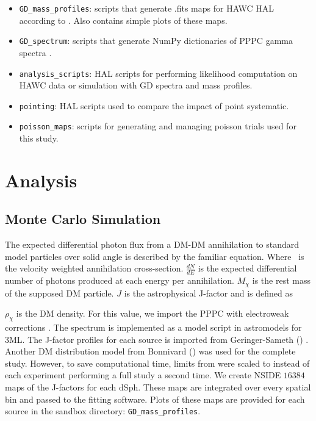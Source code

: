 \begin{itemize}
    \item \texttt{GD\_mass\_profiles}: scripts that generate .fits maps for HAWC HAL according to \cite{Geringer-Sameth:2014yza}. Also contains simple plots of these maps.
    \item \texttt{GD\_spectrum}: scripts that generate NumPy dictionaries of PPPC gamma spectra \cite{Cirelli_2011}.
    \item \texttt{analysis\_scripts}: HAL scripts for performing likelihood computation on HAWC data or simulation with GD spectra and mass profiles.
    \item \texttt{pointing}: HAL scripts used to compare the impact of point systematic.
    \item \texttt{poisson\_maps}: scripts for generating and managing poisson trials used for this study.
\end{itemize}

\section{Analysis}

\subsection{Monte Carlo Simulation}
The expected differential photon flux from a DM-DM annihilation to standard model
particles over solid angle is described by the familiar equation.
\iddmannilation[\gamma]
Where \sv~is the velocity weighted annihilation cross-section.
$\frac{dN}{dE}$ is the expected differential number of photons produced at each energy per annihilation.
$M_\chi$ is the rest mass of the supposed DM particle.
$J$ is the astrophysical J-factor and is defined as

$\rho_{\chi}$ is the DM density.
For this value, we import the PPPC with electroweak corrections \cite{Cirelli_2011}.
The spectrum is implemented as a model script in astromodels for 3ML.
The J-factor profiles for each source is imported from Geringer-Sameth (\GS) \cite{Geringer_Sameth_2015}.
Another DM distribution model from Bonnivard (\B) \cite{Bonnivard:2014kza} was used for the complete study.
However, to save computational time, limits from \GS were scaled to \B instead of each experiment performing a full study a second time.
We create NSIDE $16384$ maps of the J-factors for each dSph.
These maps are integrated over every spatial bin and passed to the fitting software.
Plots of these maps are provided for each source in the sandbox directory: \texttt{GD\_mass\_profiles}.

